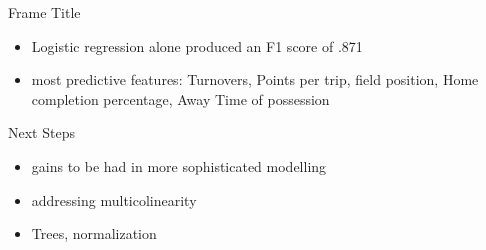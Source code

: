 \documentclass{beamer}
\begin{document}
\begin{frame}{Frame Title}
\begin{itemize}
    \item Logistic regression alone produced an F1 score of .871
    
    \item most predictive features: Turnovers, Points per trip, field position, Home completion percentage, Away Time of possession
\end{itemize}

\end{frame} 
 
 
\begin{frame}{Next Steps}
\begin{itemize}
    \item gains to be had in more sophisticated modelling
    \item addressing multicolinearity
    \item Trees, normalization
\end{itemize}   
    
\end{frame} 
 
\end{document}
